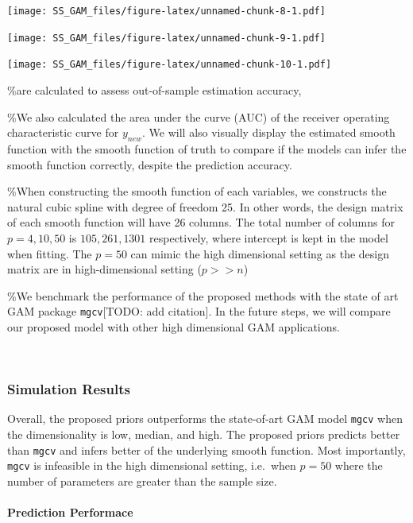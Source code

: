 \documentclass[AMA,STIX1COL,]{WileyNJD-v2}
\begin{document}
\texttt{[image: SS\_GAM\_files/figure-latex/unnamed-chunk-8-1.pdf]}

\texttt{[image: SS\_GAM\_files/figure-latex/unnamed-chunk-9-1.pdf]}

\texttt{[image: SS\_GAM\_files/figure-latex/unnamed-chunk-10-1.pdf]}

\%are calculated to assess out-of-sample estimation accuracy,

\%We also calculated the area under the curve (AUC) of the receiver
operating characteristic curve for \(y_{new}\). We will also visually
display the estimated smooth function with the smooth function of truth
to compare if the models can infer the smooth function correctly,
despite the prediction accuracy.

\%When constructing the smooth function of each variables, we constructs
the natural cubic spline with degree of freedom 25. In other words, the
design matrix of each smooth function will have 26 columns. The total
number of columns for \(p=4, 10, 50\) is \(105, 261, 1301\)
respectively, where intercept is kept in the model when fitting. The
\(p=50\) can mimic the high dimensional setting as the design matrix are
in high-dimensional setting (\(p >> n\))

\%We benchmark the performance of the proposed methods with the state of
art GAM package \texttt{mgcv}{[}TODO: add citation{]}. In the future
steps, we will compare our proposed model with other high dimensional
GAM applications.

~

\hypertarget{simulation-results}{%
\subsubsection{Simulation Results}\label{simulation-results}}

Overall, the proposed priors outperforms the state-of-art GAM model
\texttt{mgcv} when the dimensionality is low, median, and high. The
proposed priors predicts better than \texttt{mgcv} and infers better of
the underlying smooth function. Most importantly, \texttt{mgcv} is
infeasible in the high dimensional setting, i.e.~when \(p=50\) where the
number of parameters are greater than the sample size.

\hypertarget{prediction-performace}{%
\paragraph{Prediction Performace}\label{prediction-performace}}
\end{document}
